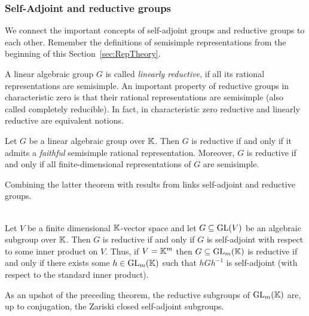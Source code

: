 




\subsubsection{Self-Adjoint and reductive groups}

We connect the important concepts of self-adjoint groups and reductive groups to each other.
Remember the definitions of semisimple representations from the beginning of this Section~\ref{sec:RepTheory}.

A linear algebraic group $G$ is called \emph{linearly reductive}, if all its rational representations are semisimple.
An important property of reductive groups in characteristic zero is that their rational representations are semisimple (also called completely reducible). In fact, in characteristic zero reductive and linearly reductive are equivalent notions.

\begin{theorem} \label{thm:ReductiveIsLinearlyReductive}
	Let $G$ be a linear algebraic group over $\mathbb K$. Then $G$ is reductive if and only if it admits a \emph{faithful} semisimple rational representation. 
	Moreover, $G$ is reductive if and only if all finite-dimensional representations of $G$ are semisimple. 
\end{theorem}

Combining the latter theorem with results from \cite{MostowSelfAdjoint} links self-adjoint and reductive groups.

\begin{theorem} \label{thm:ReductiveGroupActionToSelfAdjoint}
	\ \\
	Let $V$ be a finite dimensional $\mathbb K$-vector space and let $G \subseteq \operatorname{GL}(V)$ be an algebraic subgroup over $\mathbb K$. Then $G$ is reductive if and only if $G$ is self-adjoint with respect to some inner product on $V$.
	Thus, if $V = \mathbb K^m$ then $G \subseteq \operatorname{GL}_m(\mathbb K)$ is reductive if and only if there exists some $h \in \operatorname{GL}_m(\mathbb K)$ such that $hGh^{-1}$ is self-adjoint (with respect to the standard inner product).
\end{theorem}

As an upshot of the preceding theorem, the reductive subgroups of $\operatorname{GL}_m(\mathbb K)$ are, up to conjugation, the Zariski closed self-adjoint subgroups.




